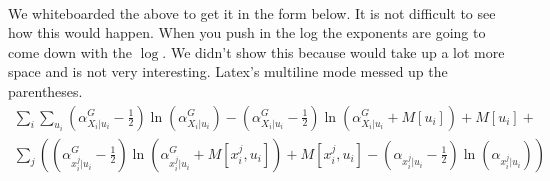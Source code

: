 \documentclass[11pt,a4paper]{article}
\begin{document}
\begin{enumerate}
\begin{multline*}
\end{multline*}
\newpage
We whiteboarded the above to get it in the form below. It is not difficult to see how this  would happen. When you push in the log the exponents are going to come down with the $\log$. We didn't show this because would take up a lot more space and is not very interesting. 
Latex's multiline mode messed up the parentheses. 
\begin{multline*}
\sum_i \sum_{u_i} (\alpha_{X_i|u_i}^G - \frac{1}{2}) \ln (\alpha_{X_i|u_i}^G ) - (\alpha_{X_i|u_i}^G   - \frac{1}{2})\ln(\alpha_{X_i|u_i}^G  + M[u_i] )  + M[u_i] + \\ \sum_j \left( (\alpha_{x_i^j|u_i}^G - \frac{1}{2}) \ln(\alpha_{x_i^j|u_i}^G + M[x_i^j,u_i]) + M[x_i^j,u_i] - (\alpha_{x_i^j|u_i} - \frac{1}{2})\ln(\alpha_{x_i^j|u_i}) \right)
\end{multline*}



\end{enumerate}
\end{document}
